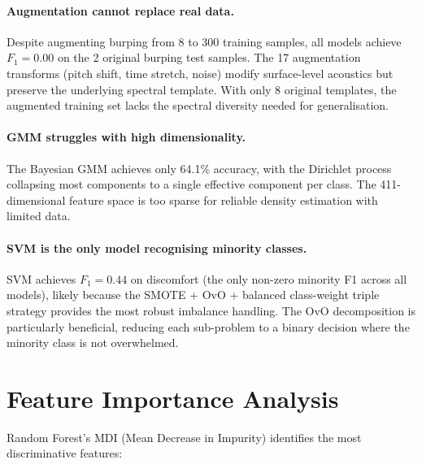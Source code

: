 \documentclass[11pt,a4paper]{article}
\begin{document}
\paragraph{Augmentation cannot replace real data.}
Despite augmenting burping from 8 to 300 training samples,
all models achieve $F_1 = 0.00$ on the 2 original burping test samples.
The 17 augmentation transforms (pitch shift, time stretch, noise) modify
surface-level acoustics but preserve the underlying spectral template.
With only 8 original templates, the augmented training set lacks the
spectral diversity needed for generalisation.

\paragraph{GMM struggles with high dimensionality.}
The Bayesian GMM achieves only 64.1\% accuracy, with the Dirichlet
process collapsing most components to a single effective component per
class. The 411-dimensional feature space is too sparse for reliable
density estimation with limited data.

\paragraph{SVM is the only model recognising minority classes.}
SVM achieves $F_1 = 0.44$ on discomfort (the only non-zero minority
F1 across all models), likely because the SMOTE + OvO + balanced
class-weight triple strategy provides the most robust imbalance
handling. The OvO decomposition is particularly beneficial, reducing
each sub-problem to a binary decision where the minority class is
not overwhelmed.

\section{Feature Importance Analysis}
\label{sec:feature_importance}

Random Forest's MDI (Mean Decrease in Impurity) identifies the most
discriminative features:
\end{document}
